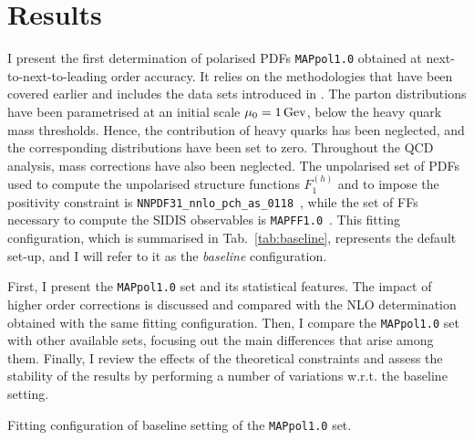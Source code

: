 \section{Results}
\label{sec:4.4}

I present the first determination of polarised PDFs \texttt{MAPpol1.0} obtained at next-to-next-to-leading order accuracy. It relies on the methodologies that have been covered earlier and includes the data sets introduced in . The parton distributions have been parametrised at an initial scale $\mu_0 = 1\,\textrm{Gev}$, below the heavy quark mass thresholds. Hence, the contribution of heavy quarks has been neglected, and the corresponding distributions have been set to zero. Throughout the QCD analysis, mass corrections have also been neglected. The unpolarised set of PDFs used to compute the unpolarised structure functions $F_1^{(h)}$ and to impose the positivity constraint is \texttt{NNPDF31\_nnlo\_pch\_as\_0118}~\cite{NNPDF:2017mvq}, while the set of FFs necessary to compute the SIDIS observables is \texttt{MAPFF1.0}~\cite{Khalek:2021gxf, AbdulKhalek:2022laj}. This fitting configuration, which is summarised in Tab.~\ref{tab:baseline}, represents the default set-up, and I will refer to it as the \textit{baseline} configuration.%

First, I present the \texttt{MAPpol1.0} set and its statistical features. The impact of higher order corrections is discussed and compared with the NLO determination obtained with the same fitting configuration. Then, I compare the \texttt{MAPpol1.0} set with other available sets, focusing out the main differences that arise among them. Finally, I review the effects of the theoretical constraints and assess the stability of the results by performing a number of variations w.r.t. the baseline setting.

\begin{table}[b!]
  \centering 
  \small
  
  \caption{
    \small
    Fitting configuration of baseline setting of the \texttt{MAPpol1.0} set.
  \label{tab:baseline}}
\end{table}

